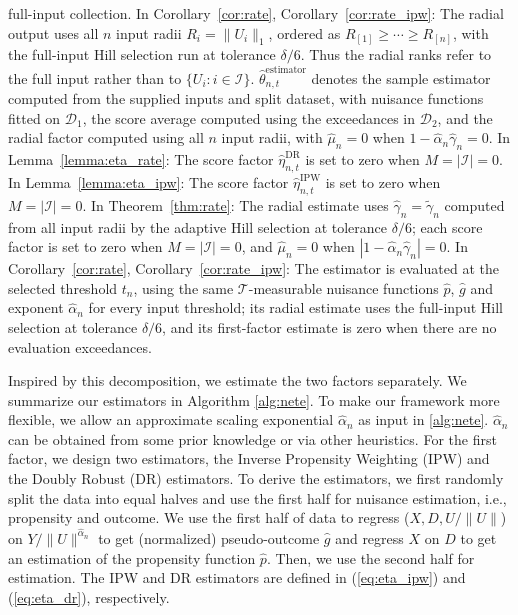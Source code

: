 \documentclass[12pt]{article}
\theoremstyle{plain}
\theoremstyle{definition}
\begin{document}
full-input collection. In Corollary~\ref{cor:rate}, Corollary~\ref{cor:rate_ipw}: The radial output uses all $n$ input radii $R_i=\|U_i\|_1$, ordered as $R_{[1]}\geq\cdots\geq R_{[n]}$, with the full-input Hill selection run at tolerance $\delta/6$. Thus the radial ranks refer to the full input rather than to $\{U_i:i\in\mathcal I\}$. $\widehat{\theta}_{n,t}^{\mathrm{estimator}}$ denotes the sample estimator computed from the supplied inputs and split dataset, with nuisance functions fitted on $\mathcal D_1$, the score average computed using the exceedances in $\mathcal D_2$, and the radial factor computed using all $n$ input radii, with $\hat\mu_n=0$ when $1-\hat\alpha_n\hat\gamma_n=0$. In Lemma~\ref{lemma:eta_rate}: The score factor $\hat\eta_{n,t}^{\mathrm{DR}}$ is set to zero when $M=|\mathcal I|=0$. In Lemma~\ref{lemma:eta_ipw}: The score factor $\hat\eta_{n,t}^{\mathrm{IPW}}$ is set to zero when $M=|\mathcal I|=0$. In Theorem~\ref{thm:rate}: The radial estimate uses $\hat\gamma_n=\widetilde\gamma_n$ computed from all input radii by the adaptive Hill selection at tolerance $\delta/6$; each score factor is set to zero when $M=|\mathcal I|=0$, and $\hat\mu_n=0$ when $|1-\hat\alpha_n\hat\gamma_n|=0$. In Corollary~\ref{cor:rate}, Corollary~\ref{cor:rate_ipw}: The estimator is evaluated at the selected threshold $t_n$, using the same $\mathcal T$-measurable nuisance functions $\hat p$, $\hat g$ and exponent $\hat\alpha_n$ for every input threshold; its radial estimate uses the full-input Hill selection at tolerance $\delta/6$, and its first-factor estimate is zero when there are no evaluation exceedances.


Inspired by this decomposition, we estimate the two factors separately. We summarize our estimators in Algorithm \ref{alg:nete}. To make our framework more flexible, we allow an approximate scaling exponential $\hat{\alpha}_n$ as input in \cref{alg:nete}. $\hat{\alpha}_n$ can be obtained from some prior knowledge or via other heuristics. For the first factor, we design two estimators, the Inverse Propensity Weighting (IPW) and the Doubly Robust (DR) estimators. To derive the estimators, we first randomly split the data into equal halves and use the first half for nuisance estimation, i.e., propensity and outcome. We use the first half of data to regress ($X, D, U /\|U\|$) on $Y/\|U\|^{\hat{\alpha}_n}$ to get (normalized) pseudo-outcome $\hat{g}$ and regress $X$ on $D$ to get an estimation of the propensity function $\hat{p}$. Then, we use
the second half for estimation. The IPW and DR estimators are defined in (\ref{eq:eta_ipw}) and (\ref{eq:eta_dr}), respectively.  
\end{document}

